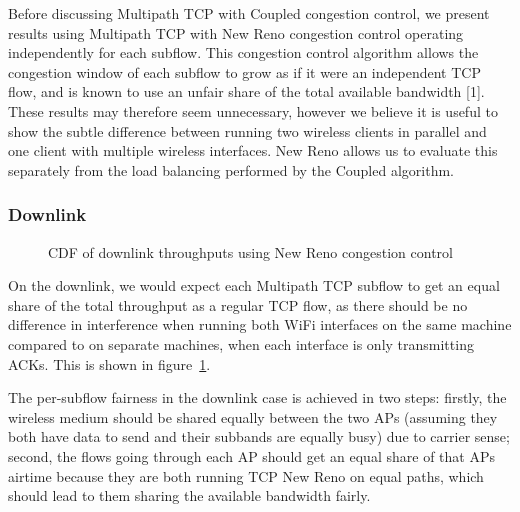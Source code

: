 Before discussing Multipath TCP with Coupled congestion control, we present results using Multipath TCP with New Reno congestion
control operating independently for each subflow. This congestion control algorithm allows the congestion window of each subflow to grow as if it were an independent TCP flow, and is known to use an unfair share of the total available bandwidth [1]. These results may therefore seem unnecessary, however we believe it is useful to show the subtle difference between running two wireless clients in parallel and one client with multiple wireless interfaces. New Reno allows us to evaluate this separately from the load balancing performed by the Coupled algorithm.


\subsubsection{Downlink}
\label{sec:results-mptcp-down}

\begin{figure}[h]
 \centering
 \subfloat[][2.4 GHz, disparate channel] {\
 }
 \subfloat[][5 and 2.4 GHz] {\
 }

 \caption{CDF of downlink throughputs using New Reno congestion control}\label{graph:reno-down}
\end{figure}

On the downlink, we would expect each Multipath TCP subflow to get an equal
share of the total throughput as a regular TCP flow, as there should be
no difference in interference when running both WiFi interfaces
on the same machine compared to on separate machines, when each interface is
only transmitting ACKs. This is shown in
figure~\ref{graph:reno-down}.

The per-subflow fairness in the downlink case is achieved in two steps: firstly,
the wireless medium should be shared equally between the two APs (assuming they
both have data to send and their subbands are equally busy) due to carrier
sense; second, the flows going through each AP should get an equal share of
that APs airtime because they are both running TCP New Reno on equal paths,
which should lead to them sharing the available bandwidth fairly.

